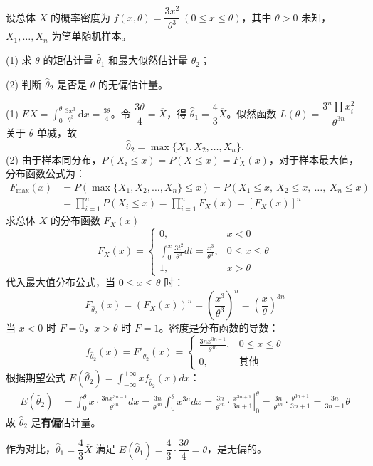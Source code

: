 ﻿\documentclass[lang=cn,11pt]{elegantbook}
\begin{document}
\begin{exercise}\label{exer:7-mono-3x2}
设总体 \(X\) 的概率密度为 \(f(x,\theta) = \dfrac{3x^2}{\theta^3}\ (0 \leq x \leq \theta)\)，其中 \(\theta > 0\) 未知，\(X_1, \dots, X_n\) 为简单随机样本。\par
(1) 求 \(\theta\) 的矩估计量 \(\hat{\theta}_1\) 和最大似然估计量 \(\hat{\theta}_2\)；\par
(2) 判断 \(\hat{\theta}_2\) 是否是 \(\theta\) 的无偏估计量。
\end{exercise}
\begin{solution}
(1) \(EX = \displaystyle\int_0^\theta \frac{3x^3}{\theta^3}\,\mathrm{d}x = \frac{3\theta}{4}\)。令 \(\dfrac{3\theta}{4} = \overline{X}\)，得 \(\hat{\theta}_1 = \dfrac{4}{3}\overline{X}\)。似然函数 \(L(\theta) = \dfrac{3^n\prod x_i^2}{\theta^{3n}}\) 关于 \(\theta\) 单减，故
\[
\hat{\theta}_2 = \max\{X_1, X_2, \dots, X_n\}.
\]
(2) 由于样本同分布，$P(X_i \le x) = P(X \le x) = F_X(x)$，对于样本最大值，分布函数公式为：
\begin{align*}
F_{\max}(x) &= P\left(\max\{X_1,X_2,\dots,X_n\} \leq x\right) = P\left(X_1 \leq x,\ X_2 \leq x,\ \dots,\ X_n \leq x\right)\\
&= \prod_{i=1}^n P(X_i \leq x) = \prod_{i=1}^n F_X(x) = \left[F_X(x)\right]^n
\end{align*}
求总体 $X$ 的分布函数 $F_X(x)$
$$F_X(x) =
\begin{cases}
0, & x<0 \\
\displaystyle \int_{0}^{x} \frac{3t^2}{\theta^3} dt = \frac{x^3}{\theta^3}, & 0\leq x\leq\theta \\
1, & x>\theta
\end{cases}$$
代入最大值分布公式，当 $0\leq x\leq\theta$ 时：
$$F_{\hat{\theta}_2}(x) = \left(F_X(x)\right)^n = \left(\frac{x^3}{\theta^3}\right)^n = \left(\frac{x}{\theta}\right)^{3n}$$
当 $x<0$ 时 $F=0$，$x>\theta$ 时 $F=1$。密度是分布函数的导数：
$$f_{\hat{\theta}_2}(x) = F'_{\hat{\theta}_2}(x) =\begin{cases}\displaystyle \frac{3n x^{3n-1}}{\theta^{3n}}, & 0\leq x\leq\theta \\0, & \text{其他}\end{cases}$$
根据期望公式 $E(\hat{\theta}_2) = \int_{-\infty}^{+\infty} x f_{\hat{\theta}_2}(x) dx$：
$$\begin{aligned}
E(\hat{\theta}_2) &= \int_{0}^{\theta} x \cdot \frac{3n x^{3n-1}}{\theta^{3n}} dx = \frac{3n}{\theta^{3n}} \int_{0}^{\theta} x^{3n} dx = \frac{3n}{\theta^{3n}} \cdot \left. \frac{x^{3n+1}}{3n+1} \right|_{0}^{\theta} = \frac{3n}{\theta^{3n}} \cdot \frac{\theta^{3n+1}}{3n+1} = \frac{3n}{3n+1} \theta
\end{aligned}$$
故 \(\hat{\theta}_2\) 是\textbf{有偏}估计量。
\begin{note}
作为对比，\(\hat{\theta}_1 = \dfrac{4}{3}\overline{X}\) 满足 \(E(\hat{\theta}_1) = \dfrac{4}{3}\cdot\dfrac{3\theta}{4} = \theta\)，是无偏的。
\end{note}
\end{solution}
\end{document}

